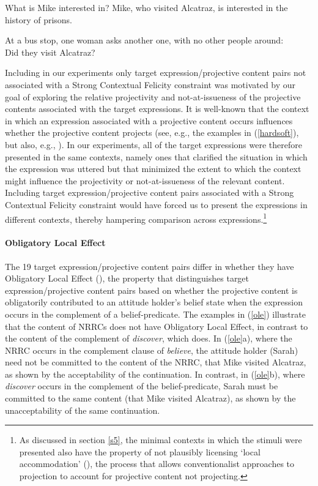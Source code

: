 \documentclass[11pt,fleqn]{article}
\newcommand{\6}{\mbox{$[\hspace*{-.6mm}[$}}
\newcommand{\9}{\mbox{$]\hspace*{-.6mm}]$}}
\def\infelic{{\leavevmode\llap{\#}}}
\begin{document}
\begin{exe}
\begin{xlist}
 What is Mike interested in?
 Mike, who visited Alcatraz, is interested in the history of prisons.
\end{xlist}

\ex\label{scf} At a bus stop, one woman asks another one, with no other people around: \\ \infelic Did they visit Alcatraz?
\end{exe}

Including in our experiments only target expression/projective content pairs not associated with a Strong Contextual Felicity constraint was motivated by our goal of exploring the relative projectivity and not-at-issueness of the projective contents associated with the target expressions. It is well-known that the context in which an expression associated with a projective content occurs influences whether the projective content projects (see, e.g., the examples in (\ref{hardsoft}), but also, e.g., \citealt{simons01,beaver-belly}). In our experiments, all of the target expressions were therefore presented in the same contexts, namely ones that clarified the situation in which the expression was uttered but that minimized the extent to which the context might influence the projectivity or not-at-issueness of the relevant content. Including target expression/projective content pairs associated with a Strong Contextual Felicity constraint would have forced us to present the expressions in different contexts, thereby hampering comparison across expressions.\footnote{As discussed in section \ref{s5}, the minimal contexts in which the stimuli were presented also have the property of not plausibly licensing `local accommodation' (\citealt{heim83,vds92}), the process that allows conventionalist approaches to projection to account for projective content not projecting.} 

\paragraph{Obligatory Local Effect} The 19 target expression/projective content pairs differ in whether they have Obligatory Local Effect (\citealt{brst-lang11}), the property that distinguishes target expression/projective content pairs based on whether the projective content is obligatorily contributed to an attitude holder's belief state when the expression occurs in the complement of a belief-predicate. The examples in (\ref{ole}) illustrate that the content of NRRCs does not have Obligatory Local Effect, in contrast to the content of the complement of {\em discover}, which does. In (\ref{ole}a), where the NRRC occurs in the complement clause of {\em believe}, the attitude holder (Sarah) need not be committed to the content of the NRRC, that Mike visited Alcatraz, as shown by the acceptability of the continuation. In contrast, in (\ref{ole}b), where {\em discover} occurs in the complement of the belief-predicate, Sarah must be committed to the same content (that Mike visited Alcatraz), as shown by the unacceptability of the same continuation. 
\end{document}
